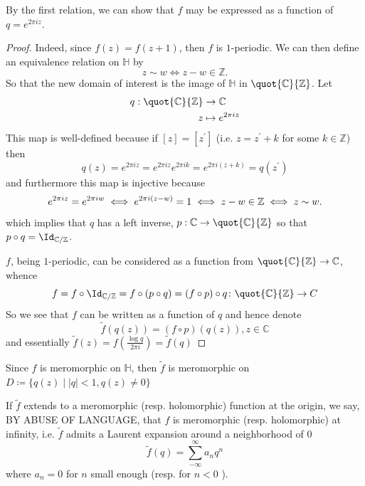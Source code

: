 \documentclass[12pt]{article}
\theoremstyle{definition}
\begin{document}
By the first relation, we can show that \(f\) may be expressed as a function of \(q=e^{2 \pi i z}\). 
\begin{proof}
Indeed, since \(f(z)=f(z+1)\), then \(f\) is \(1\)-periodic. We can then define an equivalence relation on \(\mathbb{H}\) by
\[
    z \sim w \iff z - w \in \mathbb{Z}.
\]     
So that the new domain of interest is the image of \(\mathbb{H}\) in \(\quot{\mathbb{C} }{\mathbb{Z} } \). Let 
\begin{align*}
q: \quot{\mathbb{C} }{\mathbb{Z} } &\to \mathbb{C} \\
z &\mapsto e^{2\pi iz} 
\end{align*}
This map is well-defined because if \([z]=[z^{\prime} ]\) (i.e. \(z = z^{\prime} +k\) for some \(k \in \mathbb{Z} \)) then
\[
    q(z) = e^{2\pi  i z} = e^{2\pi i z}e^{2\pi i k} = e^{2\pi i(z+k)} = q(z^{\prime} )
\] 
and furthermore this map is injective because
\[
    e^{2 \pi i z} = e^{2\pi i w} \iff e^{2\pi i (z - w)} = 1 \iff z - w \in \Bbb{Z} \iff z \sim w.
\]
which implies that \(q\) has a left inverse, \(p: \mathbb{C} \to \quot{\mathbb{C} }{\mathbb{Z} } \) so that \(p\circ q = \Id_{ \mathbb{C} / \mathbb{Z} } \). 

\(f\), being \(1\)-periodic, can be considered as a function from \(\quot{\mathbb{C} }{\mathbb{Z} } \to \mathbb{C} \), whence
\[
    f = f \circ \Id_{\mathbb{C} /\mathbb{Z} } = f \circ (p \circ q) = (f \circ p) \circ q \colon \quot{\mathbb{C} }{\mathbb{Z} } \to  C 
\]
So we see that \(f\) can be written as a function of \(q\) and hence denote \[\widetilde{f}(q(z)) = (f \circ p)(q(z)), z\in \mathbb{C}  \]  
and essentially \(\widetilde{f}(z) = f \left(\frac{\log q}{2\pi i}\right) = \widetilde{f} (q)\) 
\end{proof}  
Since \(f\) is meromorphic on \(\mathbb{H}\), then \(\widetilde{f} \) is meromorphic on \(D\coloneqq \{ q(z) \mid |q|<1, q(z) \ne 0\} \)

If \(\widetilde{f} \) extends to a meromorphic (resp. holomorphic) function at the origin, we say, BY ABUSE OF LANGUAGE, that \(f\) is meromorphic (resp. holomorphic) at infinity, i.e. \(\widetilde{f} \) admits a Laurent expansion around a neighborhood of \(0\)
\[
    \widetilde{f}(q) = \sum_{-\infty }^{\infty} a_{n}q^n   
\]    where \(a_n = 0 \) for \(n \) small enough (resp. for \(n<0\) ).
\end{document}
